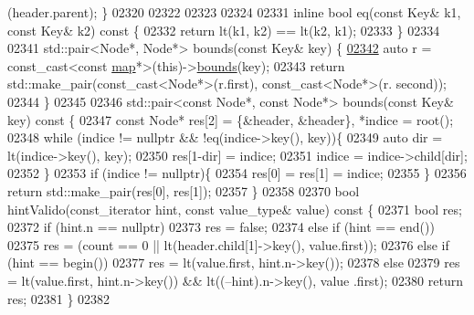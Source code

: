 \begin{DoxyCode}
      (header.parent); \}
02320 
02322 
02323 
02324 
02331     \textcolor{keyword}{inline} \textcolor{keywordtype}{bool} eq(\textcolor{keyword}{const} Key& k1, \textcolor{keyword}{const} Key& k2)\textcolor{keyword}{ const }\{
02332         \textcolor{keywordflow}{return} lt(k1, k2) == lt(k2, k1);
02333     \}
02334 
02341     std::pair<Node*, Node*> bounds(\textcolor{keyword}{const} Key& key) \{
\hypertarget{map_8h_source_l02342}{}\hyperlink{classaed2_1_1map_a4d903414b3f1f1e6f785342bb3900572_a4d903414b3f1f1e6f785342bb3900572}{02342}         \textcolor{keyword}{auto} r = \textcolor{keyword}{const\_cast<}\textcolor{keyword}{const }\hyperlink{classaed2_1_1map}{map}*\textcolor{keyword}{>}(\textcolor{keyword}{this})->\hyperlink{classaed2_1_1map_a4d903414b3f1f1e6f785342bb3900572_a4d903414b3f1f1e6f785342bb3900572}{bounds}(key);
02343         \textcolor{keywordflow}{return} std::make\_pair(const\_cast<Node*>(r.first), const\_cast<Node*>(r.
      second));
02344     \}
02345 
02346     std::pair<const Node*, const Node*> bounds(\textcolor{keyword}{const} Key& key)\textcolor{keyword}{ const }\{
02347         \textcolor{keyword}{const} Node* res[2] = \{&header, &header\}, *indice = root();
02348         \textcolor{keywordflow}{while} (indice != \textcolor{keyword}{nullptr} && !eq(indice->key(), key))\{
02349             \textcolor{keyword}{auto} dir = lt(indice->key(), key);
02350             res[1-dir] = indice;
02351             indice = indice->child[dir];
02352         \}
02353         \textcolor{keywordflow}{if} (indice != \textcolor{keyword}{nullptr})\{
02354             res[0] = res[1] = indice;
02355         \}
02356         \textcolor{keywordflow}{return} std::make\_pair(res[0], res[1]);
02357     \}
02358 
02370     \textcolor{keywordtype}{bool} hintValido(const\_iterator hint, \textcolor{keyword}{const} value\_type& value)\textcolor{keyword}{ const }\{
02371         \textcolor{keywordtype}{bool} res;
02372         \textcolor{keywordflow}{if} (hint.n == \textcolor{keyword}{nullptr})
02373             res = \textcolor{keyword}{false};
02374         \textcolor{keywordflow}{else} \textcolor{keywordflow}{if} (hint == end())
02375             res = (count == 0 || lt(header.child[1]->key(), value.first));
02376         \textcolor{keywordflow}{else} \textcolor{keywordflow}{if} (hint == begin())
02377             res = lt(value.first, hint.n->key());
02378         \textcolor{keywordflow}{else}
02379             res = lt(value.first, hint.n->key()) && lt((--hint).n->key(), value
      .first);
02380         \textcolor{keywordflow}{return} res;
02381     \}
02382 

\end{DoxyCode}
